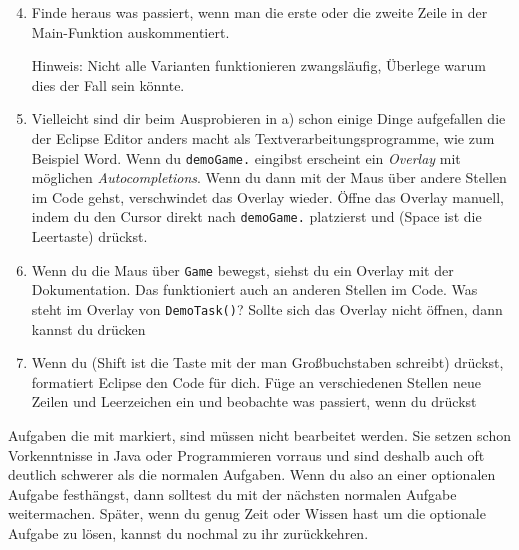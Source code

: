 \begin{enumerate} \setcounter{enumi}{3}
\item Finde heraus was passiert, wenn man die erste oder die zweite Zeile in der Main-Funktion auskommentiert.

Hinweis: Nicht alle Varianten funktionieren zwangsläufig, Überlege warum dies der Fall sein könnte.
\item Vielleicht sind dir beim Ausprobieren in a) schon einige Dinge aufgefallen die der Eclipse Editor anders macht als Textverarbeitungsprogramme, wie zum Beispiel Word.
Wenn du \lstinline{demoGame.} eingibst erscheint ein \textit{Overlay} mit möglichen \textit{Autocompletions}.
Wenn du dann mit der Maus über andere Stellen im Code gehst, verschwindet das Overlay wieder.
Öffne das Overlay manuell, indem du den Cursor direkt nach \lstinline{demoGame.} platzierst und  (Space ist die Leertaste) drückst.
\item
Wenn du die Maus über \lstinline{Game} bewegst, siehst du ein Overlay mit der Dokumentation.
Das funktioniert auch an anderen Stellen im Code.
Was steht im Overlay von \lstinline{DemoTask()}? Sollte sich das Overlay nicht öffnen, dann kannst du  drücken
\item
Wenn du  (Shift ist die Taste mit der man Großbuchstaben schreibt) drückst, formatiert Eclipse den Code für dich.
Füge an verschiedenen Stellen neue Zeilen und Leerzeichen ein und beobachte was passiert, wenn du  drückst
\end{enumerate}


\begin{Infobox}
    Aufgaben die mit \optional markiert, sind müssen nicht bearbeitet werden.
    Sie setzen schon Vorkenntnisse in Java oder Programmieren vorraus und sind deshalb auch oft deutlich schwerer als die normalen Aufgaben.
    Wenn du also an einer optionalen Aufgabe festhängst, dann solltest du mit der nächsten normalen Aufgabe weitermachen.
    Später, wenn du genug Zeit oder Wissen hast um die optionale Aufgabe zu lösen, kannst du nochmal zu ihr zurückkehren.
\end{Infobox}



